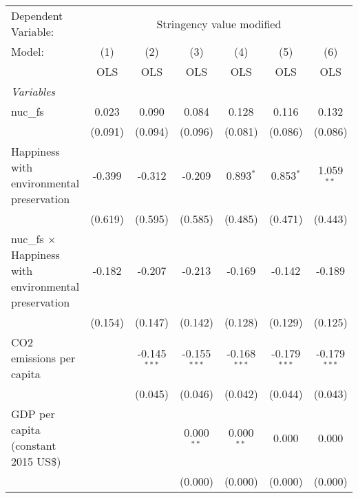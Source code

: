 
\begingroup
\centering
\begin{tabular}{lcccccc}
   \toprule
   Dependent Variable: & \multicolumn{6}{c}{Stringency value modified}\\
   Model:                                                       & (1)     & (2)            & (3)            & (4)            & (5)            & (6)\\  
                                                                &  OLS    & OLS            & OLS            & OLS            & OLS            & OLS\\  
   \midrule
   \emph{Variables}\\
   nuc\_fs                                                      & 0.023   & 0.090          & 0.084          & 0.128          & 0.116          & 0.132\\   
                                                                & (0.091) & (0.094)        & (0.096)        & (0.081)        & (0.086)        & (0.086)\\   
   Happiness with environmental preservation                    & -0.399  & -0.312         & -0.209         & 0.893$^{*}$    & 0.853$^{*}$    & 1.059$^{**}$\\   
                                                                & (0.619) & (0.595)        & (0.585)        & (0.485)        & (0.471)        & (0.443)\\   
   nuc\_fs $\times$ Happiness with environmental preservation   & -0.182  & -0.207         & -0.213         & -0.169         & -0.142         & -0.189\\   
                                                                & (0.154) & (0.147)        & (0.142)        & (0.128)        & (0.129)        & (0.125)\\   
   CO2 emissions per capita                                     &         & -0.145$^{***}$ & -0.155$^{***}$ & -0.168$^{***}$ & -0.179$^{***}$ & -0.179$^{***}$\\   
                                                                &         & (0.045)        & (0.046)        & (0.042)        & (0.044)        & (0.043)\\   
   GDP per capita (constant 2015 US\$)                          &         &                & 0.000$^{**}$   & 0.000$^{**}$   & 0.000          & 0.000\\   
                                                                &         &                & (0.000)        & (0.000)        & (0.000)        & (0.000)\\   

\end{tabular}
